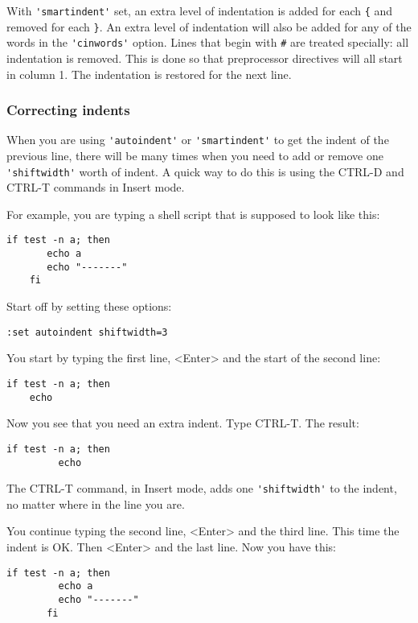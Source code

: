 With \verb!'smartindent'! set, an extra level of indentation is added for each \verb!{! and removed for each \verb!}!.
An extra level of indentation will also be added for any of the words in the \verb!'cinwords'! option.
Lines that begin with \verb!#! are treated specially: all indentation is removed.
This is done so that preprocessor directives will all start in column 1.
The indentation is restored for the next line.

\subsubsection{Correcting indents}
When you are using \verb!'autoindent'! or \verb!'smartindent'! to get the indent of the previous line, there will be many times when you need to add or remove one \verb!'shiftwidth'! worth of indent.
A quick way to do this is using the CTRL-D and CTRL-T commands in Insert mode.

For example, you are typing a shell script that is supposed to look like this:

\begin{Verbatim}[samepage=true]
    if test -n a; then 
       echo a 
       echo "-------" 
    fi 
\end{Verbatim}

Start off by setting these options:

\begin{Verbatim}[samepage=true]
 :set autoindent shiftwidth=3
\end{Verbatim}

You start by typing the first line, <Enter> and the start of the second line:

\begin{Verbatim}[samepage=true]
    if test -n a; then 
    echo 
\end{Verbatim}

Now you see that you need an extra indent.
Type CTRL-T.
The result:

\begin{Verbatim}[samepage=true]
    if test -n a; then 
         echo 
\end{Verbatim}

The CTRL-T command, in Insert mode, adds one \verb!'shiftwidth'! to the indent, no matter where in the line you are.

You continue typing the second line, <Enter> and the third line.
This time the indent is OK.
Then <Enter> and the last line.
Now you have this:

\begin{Verbatim}[samepage=true]
    if test -n a; then 
         echo a 
         echo "-------" 
       fi 
\end{Verbatim}

